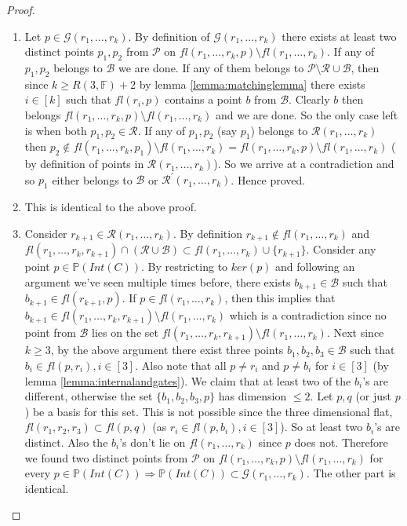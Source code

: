\documentclass[12pt]{caltech_thesis}
\theoremstyle{plain}
\theoremstyle{definition}
\newcommand{\F}{\mathbb{F}}
\newcommand{\MB}{\mathcal{B}}
\newcommand{\MP}{\mathcal{P}}
\newcommand{\MR}{\mathcal{R}}
\newcommand{\MG}{\mathcal{G}}
\newcommand{\PP}{\mathbb{P}}
\begin{document}
 \begin{proof}
  \begin{enumerate}
   \item Let $p\in \MG(r_1,\ldots,r_k)$. By definition of $\MG(r_1,\ldots,r_k)$ there exists at least two distinct points $p_1,p_2$
   from $\MP$ on $fl(r_1,\ldots,r_k,p)\setminus fl(r_1,\ldots,r_k)$. If any of $p_1,p_2$ belongs to $\MB$ we are done. If any of
   them belongs to $\MP\setminus \MR\cup \MB$, then since $k\geq R(3,\F)+2$ by lemma \ref{lemma:matchinglemma} there exists
   $i\in [k]$ such that $fl(r_i,p)$ contains a point $b$ from $\MB$. Clearly $b$ then belongs 
   $fl(r_1,\ldots,r_k,p)\setminus fl(r_1,\ldots,r_k)$ and we are done. So the only case left is when both $p_1,p_2 \in \MR$. 
   If any of $p_1,p_2$ (say $p_1$) belongs to $\MR(r_1,\ldots,r_k)$ then $p_2\notin fl(r_1,\ldots,r_k,p_1)\setminus fl(r_1,\ldots,r_k) = 
   fl(r_1,\ldots,r_k,p)\setminus fl(r_1,\ldots,r_k)$ ( by definition of points in $\MR(r_1,\ldots,r_k)$). So we arrive at a contradiction
   and so $p_1$ either belongs to $\MB$ or $\MR^\prime(r_1,\ldots,r_k)$. Hence proved.
   
   \item This is identical to the above proof.
   
   \item Consider $r_{k+1} \in \MR(r_1,\ldots,r_k)$. By definition $r_{k+1}\notin fl(r_1,\ldots,r_k)$ and 
   $fl(r_1,\ldots,r_k,r_{k+1})\cap (\MR\cup \MB) \subset fl(r_1,\ldots,r_k)\cup \{r_{k+1}\}$. Consider any point $p\in \PP(Int(C))$.
   By restricting to $ker(p)$ and following an argument we've seen multiple times before, there exists $b_{k+1} \in \MB$ such that
   $b_{k+1}\in fl(r_{k+1},p)$. If $p\in fl(r_1,\ldots,r_k)$, then this implies that $b_{k+1}\in fl(r_1,\ldots,r_k,r_{k+1})\setminus 
   fl(r_1,\ldots,r_k)$ which is a contradiction since no point from $\MB$ lies on the set $fl(r_1,\ldots,r_k,r_{k+1})\setminus 
   fl(r_1,\ldots,r_k)$. Next since $k\geq 3$, by the above argument there exist three points $b_1,b_2,b_3 \in \MB$ such that
   $b_i\in fl(p,r_i), i\in [3]$. Also note that all $p\neq r_i$ and $p\neq b_i$ for $i\in [3]$ (by lemma \ref{lemma:internalandgates}).
   We claim that at least two of the $b_i$'s are different, otherwise the set $\{b_1,b_2,b_3,p\}$ has dimension $\leq 2$. Let $p,q$ (or just $p$)
   be a basis for this set. This is not possible since the three dimensional flat, $fl(r_1,r_2,r_3) \subset fl(p,q)$ 
   (as $r_i\in fl(p,b_i), i\in [3]$). So at least two $b_i$'s are distinct. Also the $b_i$'s don't lie on $fl(r_1,\ldots,r_k)$
   since $p$ does not. Therefore we found two distinct points from $\MP$ on $fl(r_1,\ldots,r_k,p)\setminus fl(r_1,\ldots,r_k)$
   for every $p\in \PP(Int(C))\Rightarrow \PP(Int(C))\subset \MG(r_1,\ldots,r_k)$. The other part is identical.
   

\end{enumerate}
\end{proof}
\end{document}
